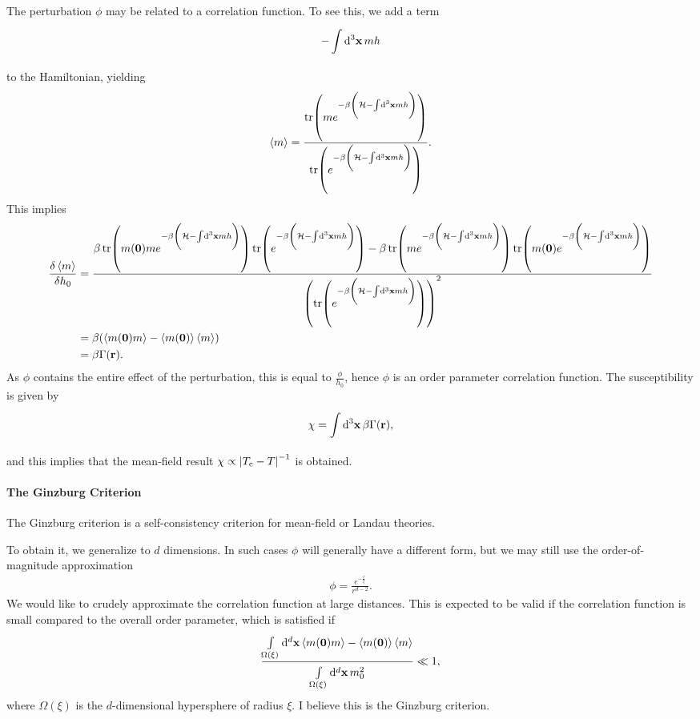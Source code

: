 The perturbation $\phi$ may be related to a correlation function. To see this, we add a term
\begin{align*}
	-\integ[3]{}{}{\vb{x}}{mh}
\end{align*}
to the Hamiltonian, yielding
\begin{align*}
	\expval{m} = \frac{\tr(me^{-\beta\left(\ham - \integ[3]{}{}{\vb{x}}{mh}\right)})}{\tr(e^{-\beta\left(\ham - \integ[3]{}{}{\vb{x}}{mh}\right)})}.
\end{align*}
This implies
\begin{align*}
	\fdv{\expval{m}}{h_{0}} &= \frac{\beta \tr(m(\vb{0})me^{-\beta\left(\ham - \integ[3]{}{}{\vb{x}}{mh}\right)})\tr(e^{-\beta\left(\ham - \integ[3]{}{}{\vb{x}}{mh}\right)}) - \beta\tr(me^{-\beta\left(\ham - \integ[3]{}{}{\vb{x}}{mh}\right)})\tr(m(\vb{0})e^{-\beta\left(\ham - \integ[3]{}{}{\vb{x}}{mh}\right)})}{\left(\tr(e^{-\beta\left(\ham - \integ[3]{}{}{\vb{x}}{mh}\right)})\right)^{2}} \\
	                       &= \beta(\expval{m(\vb{0})m} - \expval{m(\vb{0})}\expval{m}) \\
	                       &= \beta\Gamma(\vb{r}).
\end{align*}
As $\phi$ contains the entire effect of the perturbation, this is equal to $\frac{\phi}{h_{0}}$, hence $\phi$ is an order parameter correlation function. The susceptibility is given by
\begin{align*}
	\chi = \integ[3]{}{}{\vb{x}}{\beta\Gamma(\vb{r})},
\end{align*}
and this implies that the mean-field result $\chi\propto\abs{T_{\text{c}} - T}^{-1}$ is obtained.

\paragraph{The Ginzburg Criterion}
The Ginzburg criterion is a self-consistency criterion for mean-field or Landau theories.

To obtain it, we generalize to $d$ dimensions. In such cases $\phi$ will generally have a different form, but we may still use the order-of-magnitude approximation
\begin{align*}
	\phi = \frac{e^{-\frac{r}{\xi}}}{r^{d - 2}}.
\end{align*}
We would like to crudely approximate the correlation function at large distances. This is expected to be valid if the correlation function is small compared to the overall order parameter, which is satisfied if
\begin{align*}
	\frac{\integ[d]{\Omega(\xi)}{}{\vb{x}}{\expval{m(\vb{0})m} - \expval{m(\vb{0})}\expval{m}}}{\integ[d]{\Omega(\xi)}{}{\vb{x}}{m_{0}^{2}}} \ll 1,
\end{align*}
where $\Omega(\xi)$ is the $d$-dimensional hypersphere of radius $\xi$. I believe this is the Ginzburg criterion.

